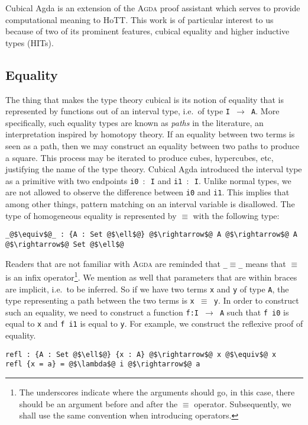 \documentclass[12pt,twoside,maitrise]{dms}
\theoremstyle{definition}
\numberwithin{equation}{section}
\numberwithin{table}{chapter}
\numberwithin{figure}{chapter}
\newcommand\id[1] {\texttt{#1}}
\newcommand\fn[1] {\texttt{#1}}
\def\Agda{\textsc{Agda}\xspace}
\begin{document}
Cubical Agda\cite{vezzosi2021cubical} is an extension of the \Agda{} proof
assistant which serves to provide computational meaning to HoTT. This work is
of particular interest to us because of two of its prominent features, cubical
equality and higher inductive types (HITs).

\subsection{Equality}
The thing that makes the type theory cubical is its notion of equality that is
represented by functions out of an interval type, i.e.\ of type \fn{I
  $\rightarrow$ A}. More specifically, such equality types are known as
\emph{paths} in the literature, an interpretation inspired by homotopy theory.
If an equality between two terms is seen as a path, then we may construct an
equality between two paths to produce a square. This process may be iterated to
produce cubes, hypercubes, etc, justifying the name of the type theory. Cubical
Agda introduced the interval type as a primitive with two endpoints \fn{i0
  $\colon$ I} and \fn{i1 $\colon$ I}. Unlike normal types, we are not allowed to
observe the difference between \id{i0} and \id{i1}. This implies that among
other things, pattern matching on an interval variable is disallowed. The type
of homogeneous equality is represented by $\equiv$ with the following type:

\begin{verbatim}
_@$\equiv$@_ : {A : Set @$\ell$@} @$\rightarrow$@ A @$\rightarrow$@ A @$\rightarrow$@ Set @$\ell$@
\end{verbatim}

Readers that are not familiar with \Agda{} are reminded that \fn{\_$\equiv$\_}
means that $\equiv$ is an infix operator\footnote{The underscores indicate where
the arguments should go, in this case, there should be an argument before and
after the $\equiv$ operator. Subsequently, we shall use the same convention when
introducing operators.}. We mention as well that parameters that are within
braces are implicit, i.e.\ to be inferred. So if we have two terms \id{x} and
\id{y} of type \id{A}, the type representing a path between the two terms is
\fn{x $\equiv$ y}. In order to construct such an equality, we need to construct
a function \id{f:I $\rightarrow$ A} such that \fn{f i0} is equal to \id{x} and
\fn{f i1} is equal to \id{y}. For example, we construct the reflexive proof of
equality.

\begin{verbatim}
refl : {A : Set @$\ell$@} {x : A} @$\rightarrow$@ x @$\equiv$@ x
refl {x = a} = @$\lambda$@ i @$\rightarrow$@ a
\end{verbatim}
\end{document}
